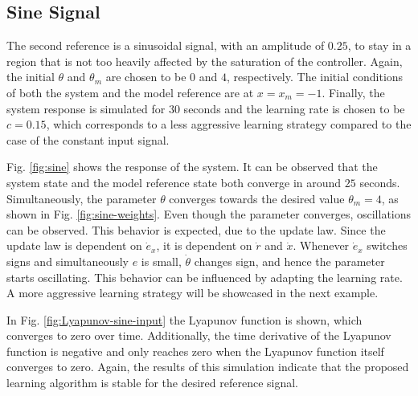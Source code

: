 \subsection{Sine Signal}
\label{sec:sine}
The second reference is a sinusoidal signal, with an amplitude of $0.25$, to stay in a region that is not too heavily affected by the saturation of the controller. Again, the initial $\theta$ and $\theta_m$ are chosen to be $0$ and $4$, respectively. The initial conditions of both the system and the model reference are at $x=x_m=-1$. Finally, the system response is simulated for $30$ seconds and the learning rate is chosen to be $c=0.15$, which corresponds to a less aggressive learning strategy compared to the case of the constant input signal.

Fig. \ref{fig:sine} shows the response of the system. It can be observed that the system state and the model reference state both converge in around $25$ seconds. Simultaneously, the parameter $\theta$ converges towards the desired value $\theta_m = 4$, as shown in Fig. \ref{fig:sine-weights}. Even though the parameter converges, oscillations can be observed. This behavior is expected, due to the update law. Since the update law is dependent on $\dot e_x$, it is dependent on $\dot r$ and $\dot x$. Whenever $\dot e_x$ switches signs and simultaneously $e$ is small, $\dot \theta$ changes sign, and hence the parameter starts oscillating. This behavior can be influenced by adapting the learning rate. A more aggressive learning strategy will be showcased in the next example.

In Fig. \ref{fig:Lyapunov-sine-input} the Lyapunov function is shown, which converges to zero over time. Additionally, the time derivative of the Lyapunov function is negative and only reaches zero when the Lyapunov function itself converges to zero. Again, the results of this simulation indicate that the proposed learning algorithm is stable for the desired reference signal.

